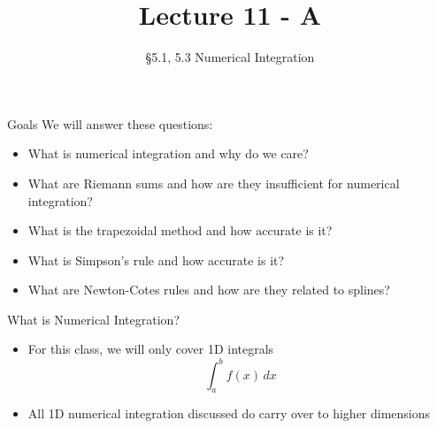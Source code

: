 \documentclass[10pt]{beamer}
\title[Math/CS 375]{Lecture 11 - A}
\subtitle{\S 5.1, 5.3 Numerical Integration}
\begin{document}
\begin{frame}
  \titlepage
\end{frame}
\begin{frame}{Goals}
We will answer these questions:\\[3mm]
\begin{itemize}
    \item What is numerical integration and why do we care?
    \item What are Riemann sums and how are they insufficient for numerical integration?
    \item What is the trapezoidal method and how accurate is it?
    \item What is Simpson's rule and how accurate is it?
    \item What are Newton-Cotes rules and how are they related to splines? 
\end{itemize}
\end{frame}
\begin{frame}{What is Numerical Integration?}
    \begin{itemize}
        \item For this class, we will only cover 1D integrals 
            $$\int_a^b f(x)\,dx$$
        \item All 1D numerical integration discussed do carry over to higher dimensions
    \end{itemize}
\end{frame}
\end{document}
